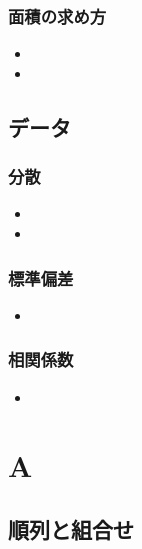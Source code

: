 \documentclass[10pt,dvipdfmx]{jsarticle}
\begin{document}
\subsubsection*{面積の求め方}
\begin{LARGE}
  \begin{itemize}
    \item  \item
  \end{itemize}
\end{LARGE}

\newpage
\subsection*{データ}
\subsubsection*{分散}
\begin{LARGE}
  \begin{itemize}
    \item \item
  \end{itemize}
\end{LARGE}

\subsubsection*{標準偏差}
\begin{LARGE}
  \begin{itemize}
    \item
  \end{itemize}
\end{LARGE}

\subsubsection*{相関係数}
\begin{LARGE}
  \begin{itemize}
    \item
  \end{itemize}
\end{LARGE}

\newpage
\section*{A}
\subsection*{順列と組合せ}
\end{document}
